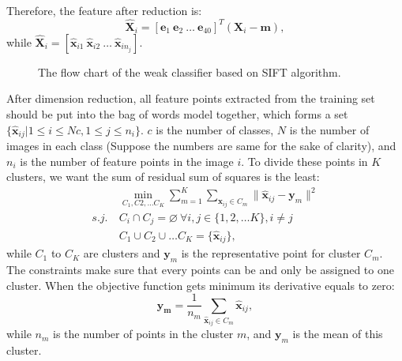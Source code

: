 \documentclass[conference]{IEEEtran}
\begin{document}
Therefore, the feature after reduction is:
\begin{equation}
	\hat{\mathbf{X}}_i = [\mathbf{e}_1\ \mathbf{e}_2\ \dots\ \mathbf{e}_{40}]^T (\mathbf{X}_i-\mathbf{m}),
\end{equation}
while $\hat{\mathbf{X}}_i = [\hat{\mathbf{x}}_{i1}\ \hat{\mathbf{x}}_{i2}\ \dots \ \hat{\mathbf{x}}_{in_j}]$.

\begin{figure}[H]
				\centering
				\caption{ The flow chart of the weak classifier based on SIFT algorithm. }
			\end{figure}

After dimension reduction, all feature points extracted from the training set should be put into the bag of words model together, which forms a set $\{\hat{\mathbf{x}}_{ij}|1\leq i \leq Nc, 1\leq j \leq n_i\}$. $c$ is the number of classes, $N$ is the number of images in each class (Suppose the numbers are same for the sake of clarity), and $n_i$ is the number of feature points in the image $i$. To divide these points in $K$ clusters, we want the sum of residual sum of squares is the least:
\begin{align}
	&\min_{C_1,C2,\dots C_K}\sum\limits_{m=1}^{K} \sum\limits_{\hat{\mathbf{x}}_{ij}\in C_m} \|\hat{\mathbf{x}}_{ij} - \mathbf{y}_m  \|^2\\
	s.j.\ &C_i\cap C_j = \varnothing\ \forall i,j \in \{1,2,\dots K\}, i \not= j\\
	&C_1\cup C_2 \cup \dots C_K = \{\hat{\mathbf{x}}_{ij}\},
\end{align}
while $C_1$ to $C_K$ are clusters and $\mathbf{y}_m$ is the representative point for cluster $C_m$. The constraints make sure that every points can be and only be assigned to one cluster. When the objective function gets minimum its derivative equals to zero:
\begin{equation}
	\mathbf{y_m} = \frac{1}{n_m} \sum\limits_{\hat{\mathbf{x}}_{ij}\in C_m} \hat{\mathbf{x}}_{ij},
\end{equation}
while $n_m$ is the number of points in the cluster $m$, and $\mathbf{y}_m$ is the mean of this cluster.
\end{document}
